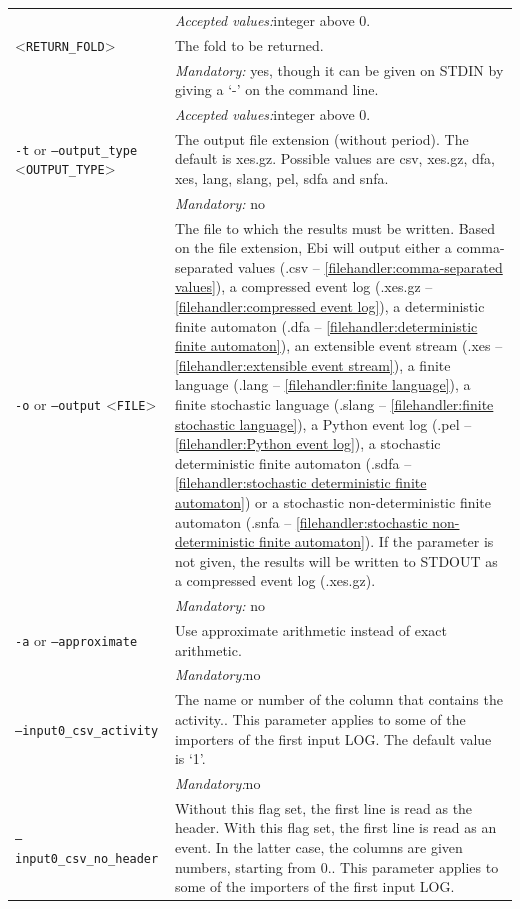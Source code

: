 {\begin{tabularx}{\linewidth}{lX}
&\textit{Accepted values:}\quad integer above 0.\\
<\texttt{RETURN\_FOLD}>&The fold to be returned.\\
&\textit{Mandatory:} \quad yes, though it can be given on STDIN by giving a `-' on the command line.\\
&\textit{Accepted values:}\quad integer above 0.\\
\texttt{-t} or \texttt{--output\_type} <\texttt{OUTPUT\_TYPE}> &
The output file extension (without period). The default is xes.gz. Possible values are csv, xes.gz, dfa, xes, lang, slang, pel, sdfa and snfa.\\
&\textit{Mandatory:} \quad no\\
\texttt{-o} or \texttt{--output} <\texttt{FILE}> &
The file to which the results must be written. Based on the file extension, Ebi will output either a comma-separated values (.csv -- \cref{filehandler:comma-separated values}), a compressed event log (.xes.gz -- \cref{filehandler:compressed event log}), a deterministic finite automaton (.dfa -- \cref{filehandler:deterministic finite automaton}), an extensible event stream (.xes -- \cref{filehandler:extensible event stream}), a finite language (.lang -- \cref{filehandler:finite language}), a finite stochastic language (.slang -- \cref{filehandler:finite stochastic language}), a Python event log (.pel -- \cref{filehandler:Python event log}), a stochastic deterministic finite automaton (.sdfa -- \cref{filehandler:stochastic deterministic finite automaton}) or a stochastic non-deterministic finite automaton (.snfa -- \cref{filehandler:stochastic non-deterministic finite automaton}).
If the parameter is not given, the results will be written to STDOUT as a compressed event log (.xes.gz).\\
&\textit{Mandatory:} \quad no\\
\texttt{-a} or \texttt{--approximate} & Use approximate arithmetic instead of exact arithmetic.\\
&\textit{Mandatory:}\quad no\\
\texttt{--input0\_csv\_activity} & The name or number of the column that contains the activity.. This parameter applies to some of the importers of the first input LOG. The default value is `1'.\\
&\textit{Mandatory:}\quad no\\
\texttt{--input0\_csv\_no\_header} & Without this flag set, the first line is read as the header. 
    With this flag set, the first line is read as an event. In the latter case, the columns are given numbers, starting from 0.. This parameter applies to some of the importers of the first input LOG. \\

\end{tabularx}}
